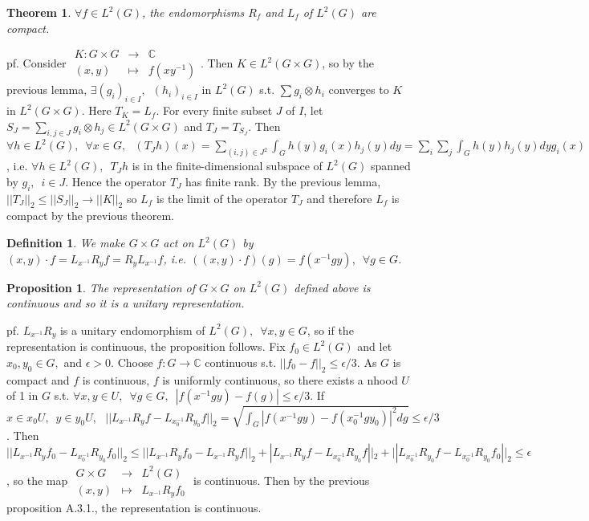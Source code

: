 \documentclass[12pt,letterpaper]{report}
\newtheorem{definition}{Definition}[section]
\newtheorem{theorem}{Theorem}[section]
\newtheorem{proposition}{Proposition}[section]
\begin{document}
\begin{theorem}$\forall f\in L^{2}(G)$, the endomorphisms $R_{f}$ and $L_{f}$ of $L^{2}(G)$ are compact.\end{theorem}
pf. Consider $\begin{array}{rrr}K:G\times G&\rightarrow&\mathbb{C}\\(x,y)&\mapsto&f(xy^{-1})\end{array}$. Then $K\in L^{2}(G\times G)$, so by the previous lemma, $\exists (g_{i})_{i\in I},\,\,\,(h_{i})_{i\in I}$ in $L^{2}(G)$ s.t. $\sum g_{i}\otimes h_{i}$ converges to $K$ in $L^{2}(G\times G)$. Here $T_{K}=L_{f}$. For every finite subset $J$ of $I$, let $S_{J}=\sum_{i,j\in J}g_{i}\otimes h_{j}\in L^{2}(G\times G)$ and $T_{J}=T_{S_{J}}$. Then $\forall h\in L^{2}(G),\,\,\,\forall x\in G,\,\,\,\,(T_{J}h)(x)=\sum_{(i,j)\in J^{2}}\int_{G}h(y)g_{i}(x)h_{j}(y)dy=\sum_{i}\sum_{j}\int_{G}h(y)h_{j}(y)dyg_{i}(x)$, i.e. $\forall h\in L^{2}(G),\,\,\,T_{J}h$ is in the finite-dimensional subspace of $L^{2}(G)$ spanned by $g_{i},\,\,\,i\in J$. Hence the operator $T_{J}$ has finite rank. By the previous lemma, $||T_{J}||_{2}\leq||S_{J}||_{2}\rightarrow ||K||_{2}$ so $L_{f}$ is the limit of the operator $T_{J}$ and therefore $L_{f}$ is compact by the previous theorem. 
\begin{definition}We make $G\times G$ act on $L^{2}(G)$ by $(x,y)\cdot f=L_{x^{-1}}R_{y}f=R_{y}L_{x^{-1}}f$, i.e. $((x,y)\cdot f)(g)=f(x^{-1}gy),\,\,\,\forall g\in G$.\end{definition}
\begin{proposition}The representation of $G\times G$ on $L^{2}(G)$ defined above is continuous and so it is a unitary representation.\end{proposition}
pf. $L_{x^{-1}}R_{y}$ is a unitary endomorphism of $L^{2}(G),\,\,\,\forall x,y\in G$, so if the representation is continuous, the proposition follows. Fix $f_{0}\in L^{2}(G)$ and let $x_{0},y_{0}\in G,$ and $\epsilon>0$. Choose $f:G\rightarrow\mathbb{C}$ continuous s.t. $||f_{0}-f||_{2}\leq\epsilon/3$. As $G$ is compact and $f$ is continuous, $f$ is uniformly continuous, so there exists a nhood $U$ of 1 in $G$ s.t. $\forall x,y\in U,\,\,\,\forall g\in G,\,\,\,|f(x^{-1}gy)-f(g)|\leq\epsilon/3$. If $x\in x_{0}U,\,\,\,y\in y_{0}U,\,\,\,\,||L_{x^{-1}}R_{y}f-L_{x_{0}^{-1}}R_{y_{0}}f||_{2}=\sqrt{\int_{G}|f(x^{-1}gy)-f(x_{0}^{-1}gy_{0})|^{2}dg}\leq \epsilon/3$. Then $||L_{x^{-1}}R_{y}f_{0}-L_{x_{0}^{-1}}R_{y_{0}}f_{0}||_{2}\leq ||L_{x^{-1}}R_{y}f_{0}-L_{x^{-1}}R_{y}f||_{2}+|L_{x^{-1}}R_{y}f-L_{x_{0}^{-1}}R_{y_{0}}f||_{2}+||L_{x_{0}^{-1}}R_{y_{0}}f-L_{x_{0}^{-1}}R_{y_{0}}f_{0}||_{2}\leq \epsilon$, so the map $\begin{array}{rrr}G\times G&\rightarrow&L^{2}(G)\\(x,y)&\mapsto&L_{x^{-1}}R_{y}f_{0}\end{array}$ is continuous. Then by the previous proposition A.3.1., the representation is continuous. 
\end{document}
